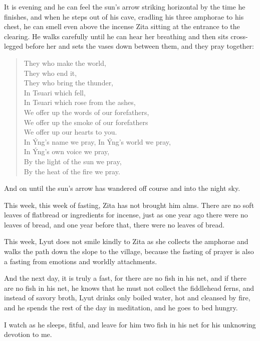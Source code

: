It is evening and he can feel the sun's arrow striking horizontal by the time he finishes, and when he steps out of his cave, cradling his three amphorae to his chest, he can smell even above the incense Zita sitting at the entrance to the clearing. He walks carefully until he can hear her breathing and then sits cross-legged before her and sets the vases down between them, and they pray together:

\begin{verse}
They who make the world, \\
They who end it, \\
They who bring the thunder, \\
In Tsuari which fell, \\
In Tsuari which rose from the ashes, \\
We offer up the words of our forefathers, \\
We offer up the smoke of our forefathers \\
We offer up our hearts to you. \\
In Ýng's name we pray, In Ýng's world we pray, \\
In Ýng's own voice we pray, \\
By the light of the sun we pray, \\
By the heat of the fire we pray.
\end{verse}

And on until the sun's arrow has wandered off course and into the night sky.

This week, this week of fasting, Zita has not brought him alms. There are no soft leaves of flatbread or ingredients for incense, just as one year ago there were no leaves of bread, and one year before that, there were no leaves of bread.

This week, Lyut does not smile kindly to Zita as she collects the amphorae and walks the path down the slope to the village, because the fasting of prayer is also a fasting from emotions and worldly attachments.

And the next day, it is truly a fast, for there are no fish in his net, and if there are no fish in his net, he knows that he must not collect the fiddlehead ferns, and instead of savory broth, Lyut drinks only boiled water, hot and cleansed by fire, and he spends the rest of the day in meditation, and he goes to bed hungry.

I watch as he sleeps, fitful, and leave for him two fish in his net for his unknowing devotion to me.

